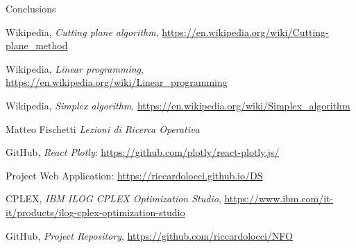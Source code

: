 \documentclass[9pt]{extarticle}
\begin{document}
    \begin{section}{Conclusions}

    \end{section}

    \begin{thebibliography}{7}

        Wikipedia,
        \textit{Cutting plane algorithm},
        \url{https://en.wikipedia.org/wiki/Cutting-plane_method}

        Wikipedia,
        \textit{Linear programming},
        \url{https://en.wikipedia.org/wiki/Linear_programming}

        Wikipedia,
        \textit{Simplex algorithm},
        \url{https://en.wikipedia.org/wiki/Simplex_algorithm}
        
        Matteo Fischetti
        \textit{ Lezioni di Ricerca Operativa }

        GitHub,
        \textit{React Plotly}:
        \url{https://github.com/plotly/react-plotly.js/}

        Project Web Application: \url{https://riccardolocci.github.io/DS}
        
        CPLEX,
        \textit{IBM ILOG CPLEX Optimization Studio},
        \url{https://www.ibm.com/it-it/products/ilog-cplex-optimization-studio}

        GitHub,
        \textit{Project Repository},
        \url{https://github.com/riccardolocci/NFO}

    \end{thebibliography}
\end{document}
